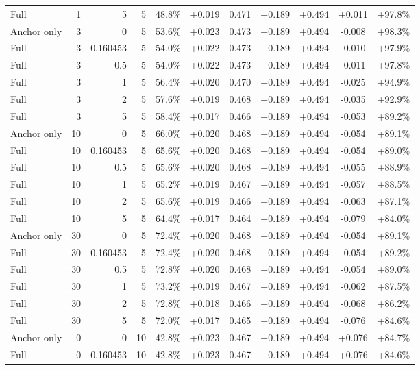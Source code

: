 \begin{table}[htbp]
\begin{tabular}{lrrrccccccc}
Full & 1 & 5 & 5 & 48.8\% & +0.019 & 0.471 & +0.189 & +0.494 & +0.011 & +97.8\% \\
Anchor only & 3 & 0 & 5 & 53.6\% & +0.023 & 0.473 & +0.189 & +0.494 & -0.008 & +98.3\% \\
Full & 3 & 0.160453 & 5 & 54.0\% & +0.022 & 0.473 & +0.189 & +0.494 & -0.010 & +97.9\% \\
Full & 3 & 0.5 & 5 & 54.0\% & +0.022 & 0.473 & +0.189 & +0.494 & -0.011 & +97.8\% \\
Full & 3 & 1 & 5 & 56.4\% & +0.020 & 0.470 & +0.189 & +0.494 & -0.025 & +94.9\% \\
Full & 3 & 2 & 5 & 57.6\% & +0.019 & 0.468 & +0.189 & +0.494 & -0.035 & +92.9\% \\
Full & 3 & 5 & 5 & 58.4\% & +0.017 & 0.466 & +0.189 & +0.494 & -0.053 & +89.2\% \\
Anchor only & 10 & 0 & 5 & 66.0\% & +0.020 & 0.468 & +0.189 & +0.494 & -0.054 & +89.1\% \\
Full & 10 & 0.160453 & 5 & 65.6\% & +0.020 & 0.468 & +0.189 & +0.494 & -0.054 & +89.0\% \\
Full & 10 & 0.5 & 5 & 65.6\% & +0.020 & 0.468 & +0.189 & +0.494 & -0.055 & +88.9\% \\
Full & 10 & 1 & 5 & 65.2\% & +0.019 & 0.467 & +0.189 & +0.494 & -0.057 & +88.5\% \\
Full & 10 & 2 & 5 & 65.6\% & +0.019 & 0.466 & +0.189 & +0.494 & -0.063 & +87.1\% \\
Full & 10 & 5 & 5 & 64.4\% & +0.017 & 0.464 & +0.189 & +0.494 & -0.079 & +84.0\% \\
Anchor only & 30 & 0 & 5 & 72.4\% & +0.020 & 0.468 & +0.189 & +0.494 & -0.054 & +89.1\% \\
Full & 30 & 0.160453 & 5 & 72.4\% & +0.020 & 0.468 & +0.189 & +0.494 & -0.054 & +89.2\% \\
Full & 30 & 0.5 & 5 & 72.8\% & +0.020 & 0.468 & +0.189 & +0.494 & -0.054 & +89.0\% \\
Full & 30 & 1 & 5 & 73.2\% & +0.019 & 0.467 & +0.189 & +0.494 & -0.062 & +87.5\% \\
Full & 30 & 2 & 5 & 72.8\% & +0.018 & 0.466 & +0.189 & +0.494 & -0.068 & +86.2\% \\
Full & 30 & 5 & 5 & 72.0\% & +0.017 & 0.465 & +0.189 & +0.494 & -0.076 & +84.6\% \\
Anchor only & 0 & 0 & 10 & 42.8\% & +0.023 & 0.467 & +0.189 & +0.494 & +0.076 & +84.7\% \\
Full & 0 & 0.160453 & 10 & 42.8\% & +0.023 & 0.467 & +0.189 & +0.494 & +0.076 & +84.6\% \\

\end{tabular}
\end{table}
